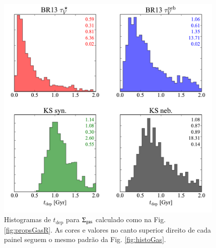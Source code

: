 \begin{figure}
	\centering
	\includegraphics[width=0.99\textwidth]{figuras/histo_tdep.pdf}
	\caption[Tempo de depleção do gás.]
	{Histogramas de $t_{\mathrm{dep}}$ para $\Sigma_{\mathrm{gas}}$ calculado como na Fig. \ref{fig:propsGasR}.
As cores e valores no canto superior direito de cada painel seguem o mesmo padrão da Fig. \ref{fig:histoGas}.}
	\label{fig:tdep}
\end{figure}

% 

